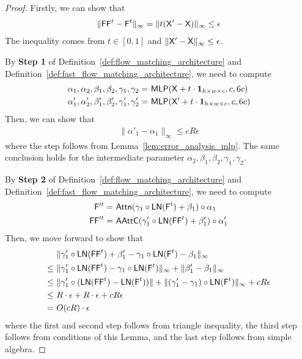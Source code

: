 \begin{proof}
    Firstly, we can show that
    \begin{align*}
        \|\mathsf{FF}^t- \mathsf{F}^t\|_\infty = \| t (\mathsf{X}' - \mathsf{X}) \|_\infty \leq \epsilon
    \end{align*}
    The inequality comes from $t \in [0,1]$ and $\|\mathsf{X}'-\mathsf{X}\|_\infty \leq \epsilon$.

    By {\bf Step 1} of Definition~\ref{def:flow_matching_architecture} and Definition~\ref{def:fast_flow_matching_architecture}, we need to compute
    \begin{align*}
        \alpha_1, \alpha_2, \beta_1, \beta_2, \gamma_1, \gamma_2=&~  \mathsf{MLP}(\mathsf{X} + t \cdot {\bf 1}_{h \times w \times c},c,6c)\\
         \alpha'_1, \alpha'_2, \beta'_1, \beta'_2, \gamma'_1, \gamma'_2=&~  \mathsf{MLP}(\mathsf{X}' + t \cdot {\bf 1}_{h \times w \times c},c,6c)\\
    \end{align*}
    Then, we can show that
    \begin{align*}
        \|\alpha'_1 - \alpha_1\|_\infty \leq c R \epsilon
    \end{align*}
    where the step follows from Lemma~\ref{lem:error_analysis_mlp}. The same conclusion holds for the intermediate parameter $\alpha_2, \beta_1, \beta_2, \gamma_1, \gamma_2$.



    By {\bf Step 2} of Definition~\ref{def:flow_matching_architecture} and Definition~\ref{def:fast_flow_matching_architecture}, we need to compute
    \begin{align*}
        \mathsf{F}'^t =&~ \mathsf{Attn}(\gamma_1 \circ \mathsf{LN}(\mathsf{F}^t)+\beta_1) \circ \alpha_1\\
        \mathsf{FF}'^t =&~ \mathsf{AAttC}(\gamma'_1 \circ \mathsf{LN}(\mathsf{FF}^t)+\beta'_1) \circ \alpha'_1\\
    \end{align*}
    Then, we move forward to show that
    \begin{align}\label{eq:flow_matching_tmp1}
        &~\| \gamma'_1 \circ \mathsf{LN}(\mathsf{FF}^t) + \beta'_1 - \gamma_1 \circ \mathsf{LN}(\mathsf{F}^t) - \beta_1\|_\infty\notag\\
        \leq&~ \| \gamma'_1 \circ \mathsf{LN}(\mathsf{FF}^t) - \gamma_1 \circ \mathsf{LN}(\mathsf{F}^t)  \|_\infty + \|\beta'_1-\beta_1\|_\infty\notag\\
        \leq&~  \| \gamma'_1 \circ (\mathsf{LN}(\mathsf{FF}^t) - \mathsf{LN}(\mathsf{F}^t))\| + \|(\gamma'_1-\gamma_1) \circ \mathsf{LN}(\mathsf{F}^t)\|_\infty + cR\epsilon\notag\\
        \leq&~ R \cdot \epsilon + R\cdot \epsilon + cR\epsilon\notag\\
        =&~ O(cR)\cdot \epsilon
    \end{align}
    where the first and second step follows from triangle inequality, the third step follows from conditions of this Lemma, and the last step follows from simple algebra.


\end{proof}
